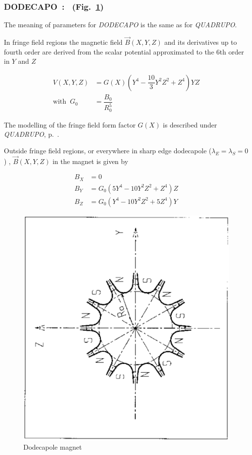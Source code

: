 {\newpage

\subsubsection*{DODECAPO~: \DODECAPOTitl\  (Fig.\protect~\ref{fig19})} \label{DODECAPO}  
\medskip


 The meaning of parameters for \textsl{DODECAPO}  is the same as for \textsl{QUADRUPO}. 

\noindent In fringe field regions the magnetic field $ \vec  B(X,Y,Z) $ and
its derivatives up to fourth order are derived from the scalar potential approximated to 
the 6th order in $ Y $ and $ Z $ 

\begin{align*}
	V(X,Y,Z) &   = G(X) \left(Y^4- \dfrac{10 }{ 3} Y^2Z^2+Z^4 \right) YZ  \\
	\text{with } ~ G_0 &   =  \dfrac{ B_0 }{ R^5_0} 
\end{align*}

\noindent The  modelling of the fringe field form factor  $G(X)$
 is described under \textsl{QUADRUPO}, p.~\pageref{QUADRUPO}. 

\bigskip

\noindent Outside fringe field regions, or everywhere in sharp edge dodecapole
($ \lambda_ E=\lambda_ S=0$) , $ \vec  B(X,Y,Z) $ in the magnet is given by 

\begin{align*}
	B_X &   =   0 \\
	B_Y &   =    G_0(5Y^4-10Y^2Z^2+Z^4)Z \\
	B_Z &   = G_0(Y^4-10Y^2Z^2+5Z^4)Y  
\end{align*}
\vfill

\begin{figure}[H]
\centerline{\includegraphics[width=12cm,angle=-90]{Fig19.ps}}
\caption{\label{fig19}Dodecapole magnet}
\end{figure}
\vfill

}
